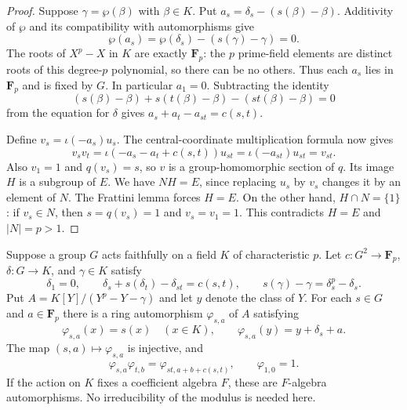 \begin{proof}
Suppose $\gamma=\wp(\beta)$ with $\beta\in K$.
Put $a_s=\delta_s-(s(\beta)-\beta)$. Additivity of $\wp$
and its compatibility with automorphisms give
\[
 \wp(a_s)=\wp(\delta_s)-(s(\gamma)-\gamma)=0.
\]
The roots of $X^p-X$ in $K$ are exactly $\mathbf F_p$:
the $p$ prime-field elements are distinct roots of this
degree-$p$ polynomial, so there can be no others.
Thus each $a_s$ lies in $\mathbf F_p$ and is fixed by $G$.
In particular $a_1=0$.
Subtracting the identity
\[
 (s(\beta)-\beta)+s(t(\beta)-\beta)
       -(st(\beta)-\beta)=0
\]
from the equation for $\delta$ gives
$a_s+a_t-a_{st}=c(s,t)$.

Define $v_s=\iota(-a_s)u_s$.
The central-coordinate multiplication formula now gives
\[
 v_sv_t
   =\iota(-a_s-a_t+c(s,t))u_{st}
   =\iota(-a_{st})u_{st}=v_{st}.
\]
Also $v_1=1$ and $q(v_s)=s$, so $v$ is a group-homomorphic
section of $q$. Its image $H$ is a subgroup of $E$.
We have $NH=E$, since replacing $u_s$ by $v_s$ changes it
by an element of $N$. The Frattini lemma forces $H=E$.
On the other hand, $H\cap N=\{1\}$: if $v_s\in N$, then
$s=q(v_s)=1$ and $v_s=v_1=1$.
This contradicts $H=E$ and $|N|=p>1$.
\end{proof}

\begin{lemma}
\label{lem:witt-semilinear-quotient-lifts}
\leanok
Suppose a group $G$ acts faithfully on a field $K$ of characteristic
$p$. Let $c:G^2\to\mathbf F_p$, $\delta:G\to K$, and $\gamma\in K$
satisfy
\[
 \delta_1=0,\qquad
 \delta_s+s(\delta_t)-\delta_{st}=c(s,t),\qquad
 s(\gamma)-\gamma=\delta_s^p-\delta_s.
\]
Put $A=K[Y]/(Y^p-Y-\gamma)$ and let $y$ denote the class of $Y$.
For each $s\in G$ and $a\in\mathbf F_p$ there is a ring automorphism
$\varphi_{s,a}$ of $A$ satisfying
\[
 \varphi_{s,a}(x)=s(x)\quad(x\in K),\qquad
 \varphi_{s,a}(y)=y+\delta_s+a.
\]
The map $(s,a)\mapsto\varphi_{s,a}$ is injective, and
\[
 \varphi_{s,a}\varphi_{t,b}=\varphi_{st,a+b+c(s,t)},\qquad
 \varphi_{1,0}=1.
\]
If the action on $K$ fixes a coefficient algebra $F$, these are
$F$-algebra automorphisms. No irreducibility of the modulus is needed here.
\end{lemma}

